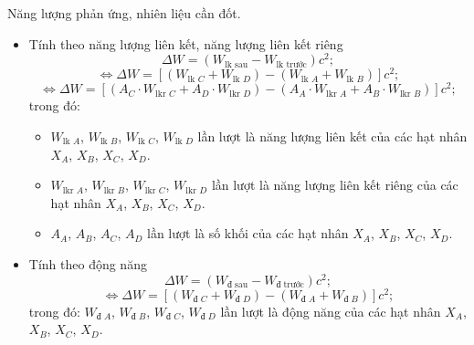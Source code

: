 \begin{dang}{Năng lượng phản ứng, nhiên liệu cần đốt.}
{\begin{itemize}
			\item Tính theo năng lượng liên kết, năng lượng liên kết riêng
			\begin{equation*}
			\Delta W = \left(W_\text{lk sau} - W_\text{lk trước}\right) c^2;
			\end{equation*}
			\begin{equation*}
			\Leftrightarrow \Delta W = \left[\left(W_{\textrm{lk }C} + W_{\textrm{lk }D} \right) -  \left(W_{\textrm{lk }A} + W_{\textrm{lk }B}\right)\right] c^2;
			\end{equation*}
			\begin{equation*}
			\Leftrightarrow \Delta W = \left[\left(A_C\cdot W_{\textrm{lkr }C} + A_D\cdot W_{\textrm{lkr }D} \right) -  \left(A_A\cdot W_{\textrm{lkr }A} + A_B\cdot W_{\textrm{lkr }B}\right)\right] c^2;
			\end{equation*}
			trong đó:
			\begin{itemize}
			\item $W_{\textrm{lk }A}$, $W_{\textrm{lk }B}$, $W_{\textrm{lk }C}$, $W_{\textrm{lk }D}$ lần lượt là năng lượng liên kết của các hạt nhân $X_A$, $X_B$, $X_C$, $X_D$.
			
			\item $W_{\textrm{lkr }A}$, $W_{\textrm{lkr }B}$, $W_{\textrm{lkr }C}$, $W_{\textrm{lkr }D}$ lần lượt là năng lượng liên kết riêng của các hạt nhân $X_A$, $X_B$, $X_C$, $X_D$.
			
			\item $A_A$, $A_B$, $A_C$, $A_D$ lần lượt là số khối của các hạt nhân $X_A$, $X_B$, $X_C$, $X_D$.
			\end{itemize}
				
			\item Tính theo động năng
			\begin{equation*}
			\Delta W = \left(W_\textrm{đ sau} - W_\textrm{đ trước}\right) c^2;
			\end{equation*}
			\begin{equation*}
			\Leftrightarrow \Delta W = \left[ \left(W_{\textrm{đ }C} + W_{\textrm{đ }D}\right)  - \left( W_{\textrm{đ }A} + W_{\textrm{đ }B}\right)\right]  c^2;
			\end{equation*}
			trong đó: $W_{\textrm{đ }A}$, $W_{\textrm{đ }B}$, $W_{\textrm{đ }C}$, $W_{\textrm{đ }D}$ lần lượt là động năng của các hạt nhân $X_A$, $X_B$, $X_C$, $X_D$.
		\end{itemize}}
		
			

\end{dang}
